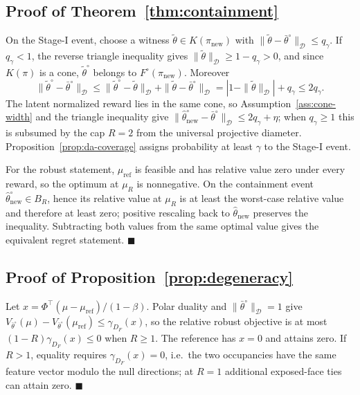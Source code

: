 \documentclass{article}
\newcommand{\Dnorm}[1]{\|#1\|_{\mathcal D}}
\begin{document}
\subsection{Proof of Theorem~\ref{thm:containment}}
\label{app:proof-containment}

On the Stage-I event, choose a witness $\tilde\theta\in K(\pi_{\mathrm{new}})$
with $\Dnorm{\tilde\theta-\bar\theta^\circ}\le q_\gamma$. If $q_\gamma<1$, the
reverse triangle inequality gives $\Dnorm{\tilde\theta}\ge1-q_\gamma>0$, and
since $K(\pi)$ is a cone, $\tilde\theta^\circ$ belongs to
$F^\circ(\pi_{\mathrm{new}})$. Moreover
\[
\Dnorm{\tilde\theta^\circ-\bar\theta^\circ}
\le \Dnorm{\tilde\theta^\circ-\tilde\theta}+\Dnorm{\tilde\theta-\bar\theta^\circ}
=|1-\Dnorm{\tilde\theta}|+q_\gamma\le2q_\gamma.
\]
The latent normalized reward lies in the same cone, so
Assumption~\ref{ass:cone-width} and the triangle inequality give
$\Dnorm{\hat\theta_{\mathrm{new}}^\circ-\bar\theta^\circ}\le2q_\gamma+\eta$;
when $q_\gamma\ge1$ this is subsumed by the cap $R=2$ from the universal
projective diameter. Proposition~\ref{prop:da-coverage} assigns probability at
least $\gamma$ to the Stage-I event.

For the robust statement, $\mu_{\mathrm{ref}}$ is feasible and has relative
value zero under every reward, so the optimum at $\mu_R$ is nonnegative. On the
containment event $\hat\theta_{\mathrm{new}}^\circ\in B_R$, hence its relative
value at $\mu_R$ is at least the worst-case relative value and therefore at
least zero; positive rescaling back to $\hat\theta_{\mathrm{new}}$ preserves the
inequality. Subtracting both values from the same optimal value gives the
equivalent regret statement. $\blacksquare$

\subsection{Proof of Proposition~\ref{prop:degeneracy}}

Let $x=\Phi^\top(\mu-\mu_{\mathrm{ref}})/(1-\beta)$. Polar duality and
$\Dnorm{\bar\theta^\circ}=1$ give
$V_{\bar\theta^\circ}(\mu)-V_{\bar\theta^\circ}(\mu_{\mathrm{ref}})
\le\gamma_{D_F}(x)$, so the relative robust objective is at most
$(1-R)\gamma_{D_F}(x)\le0$ when $R\ge1$. The reference has $x=0$ and attains
zero. If $R>1$, equality requires $\gamma_{D_F}(x)=0$, i.e.\ the two occupancies
have the same feature vector modulo the null directions; at $R=1$ additional
exposed-face ties can attain zero. $\blacksquare$
\end{document}
